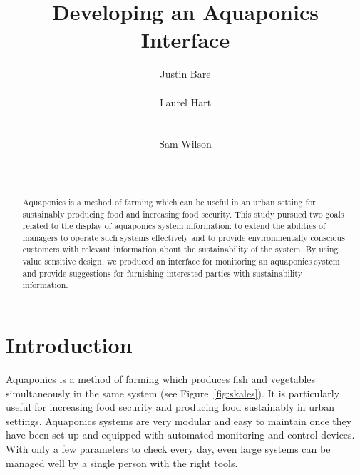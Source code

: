 \documentclass{sigchi}
\begin{document}
\title{Developing an Aquaponics Interface}

\author{
  \alignauthor Justin Bare\\
    \\
  \alignauthor Laurel Hart\\
    \\
    \\
  \alignauthor Sam Wilson\\
    \\
    \\
}

\maketitle

\begin{abstract}
Aquaponics is a method of farming which can be useful in an urban setting for sustainably producing food and increasing food security. This study pursued two goals related to the display of aquaponics system information: to extend the abilities of managers to operate such systems effectively and to provide environmentally conscious customers with relevant information about the sustainability of the system. By using value sensitive design, we produced an interface for monitoring an aquaponics system and provide suggestions for furnishing interested parties with sustainability information. 
\end{abstract}



\section{Introduction}

Aquaponics is a method of farming which produces fish and vegetables simultaneously in the same system (see Figure~\ref{fig:skales}). It is particularly useful for increasing food security and producing food sustainably in urban settings. Aquaponics systems are very modular and easy to maintain once they have been set up and equipped with automated monitoring and control devices. With only a few parameters to check every day, even large systems can be managed well by a single person with the right tools. 
\end{document}
